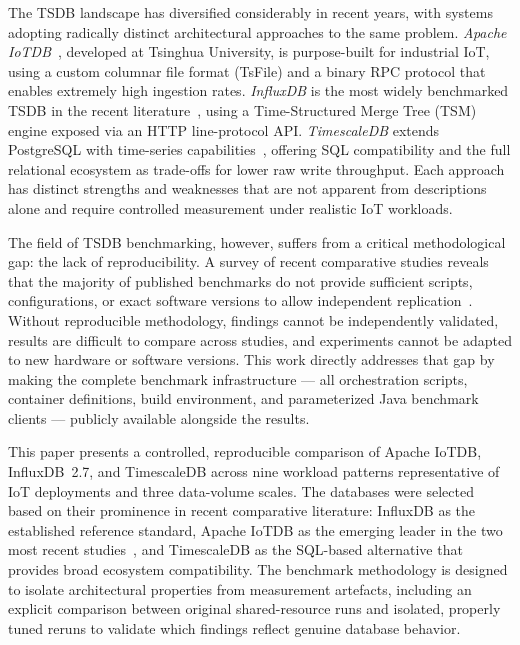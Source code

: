 The TSDB landscape has diversified considerably in recent years, with systems adopting
radically distinct architectural approaches to the same problem. \textit{Apache IoTDB}~\cite{wang2023iotdb},
developed at Tsinghua University, is purpose-built for industrial IoT, using a custom columnar
file format (TsFile) and a binary RPC protocol that enables extremely high ingestion rates.
\textit{InfluxDB} is the most widely benchmarked TSDB in the recent
literature~\cite{naqvi2017influxdb,shah2022performance,lima2024avaliando}, using a
Time-Structured Merge Tree (TSM) engine exposed via an HTTP line-protocol API. \textit{TimescaleDB}
extends PostgreSQL with time-series capabilities~\cite{Ramakrishnan2003}, offering SQL compatibility
and the full relational ecosystem as trade-offs for lower raw write throughput. Each approach has
distinct strengths and weaknesses that are not apparent from descriptions alone and require
controlled measurement under realistic IoT workloads.

The field of TSDB benchmarking, however, suffers from a critical methodological gap: the lack of
reproducibility. A survey of recent comparative studies reveals that the majority of published
benchmarks do not provide sufficient scripts, configurations, or exact software versions to
allow independent replication~\cite{pereira2023mulletbench,shah2022performance,naqvi2017influxdb}.
Without reproducible methodology, findings cannot be independently validated, results are
difficult to compare across studies, and experiments cannot be adapted to new hardware or
software versions. This work directly addresses that gap by making the complete benchmark
infrastructure --- all orchestration scripts, container definitions, build environment, and
parameterized Java benchmark clients --- publicly available alongside the results.

This paper presents a controlled, reproducible comparison of Apache IoTDB, InfluxDB~2.7,
and TimescaleDB across nine workload patterns representative of IoT deployments and three
data-volume scales. The databases were selected based on their prominence in recent comparative
literature: InfluxDB as the established reference standard, Apache IoTDB as the emerging leader
in the two most recent studies~\cite{pereira2023mulletbench,wang2023iotdb}, and TimescaleDB as
the SQL-based alternative that provides broad ecosystem compatibility. The benchmark methodology
is designed to isolate architectural properties from measurement artefacts, including an
explicit comparison between original shared-resource runs and isolated, properly tuned reruns
to validate which findings reflect genuine database behavior.

